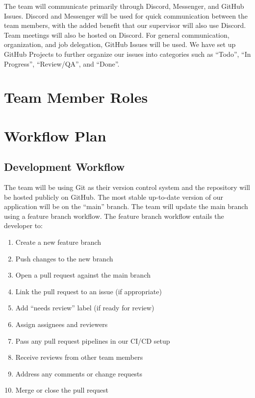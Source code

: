 \documentclass{article}
\begin{document}
The team will communicate primarily through Discord, Messenger, and GitHub Issues. Discord 
and Messenger will be used for quick communication between the team members, with the added 
benefit that our supervisor will also use Discord. Team meetings will also be hosted on Discord. For 
general communication, organization, and job delegation, GitHub Issues will be used. We have set up 
GitHub Projects to further organize our issues into categories such as ``Todo'', ``In Progress'', 
``Review/QA'', and ``Done''.

\section{Team Member Roles}

\section{Workflow Plan}


\subsection{Development Workflow}

The team will be using Git as their version control system and the repository will be hosted
publicly on GitHub. The most stable up-to-date version of our application will be on the ``main''
branch. The team will update the main branch using a feature branch workflow. The feature branch
workflow entails the developer to:

\begin{enumerate}
  \item Create a new feature branch
  \item Push changes to the new branch
  \item Open a pull request against the main branch
  \item Link the pull request to an issue (if appropriate)
  \item Add ``needs review'' label (if ready for review)
  \item Assign assignees and reviewers
  \item Pass any pull request pipelines in our CI/CD setup
  \item Receive reviews from other team members
  \item Address any comments or change requests
  \item Merge or close the pull request
\end{enumerate}
\end{document}
